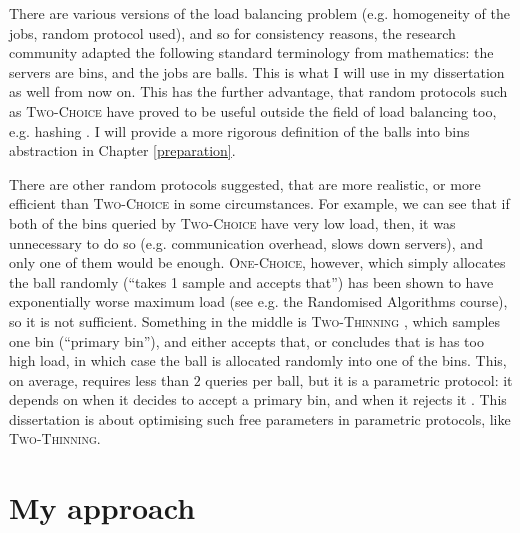 There are various versions of the load balancing problem (e.g. homogeneity of the jobs, random protocol used), and so for consistency reasons, the research community adapted the following standard terminology from mathematics: the servers are bins, and the jobs are balls. This is what I will use in my dissertation as well from now on. This has the further advantage, that random protocols such as \textsc{Two-Choice} have proved to be useful outside the field of load balancing too, e.g. hashing \cite{azar1999twochoice}. I will provide a more rigorous definition of the balls into bins abstraction in Chapter \ref{preparation}.


There are other random protocols suggested, that are more realistic, or more efficient than \textsc{Two-Choice} in some circumstances. For example, we can see that if both of the bins queried by \textsc{Two-Choice} have very low load, then, it was unnecessary to do so (e.g. communication overhead, slows down servers), and only one of them would be enough. \textsc{One-Choice}, however, which simply allocates the ball randomly (``takes 1 sample and accepts that'') has been shown to have exponentially worse maximum load (see e.g. the Randomised Algorithms course), so it is not sufficient. Something in the middle is \textsc{Two-Thinning} \cite{feldheim2021thinning}, which samples one bin (``primary bin''), and either accepts that, or concludes that is has too high load, in which case the ball is allocated randomly into one of the bins. This, on average, requires less than $2$ queries per ball, but it is a parametric protocol: it depends on when it decides to accept a primary bin, and when it rejects it . This dissertation is about optimising such free parameters in parametric protocols, like \textsc{Two-Thinning}.



\section{My approach}


